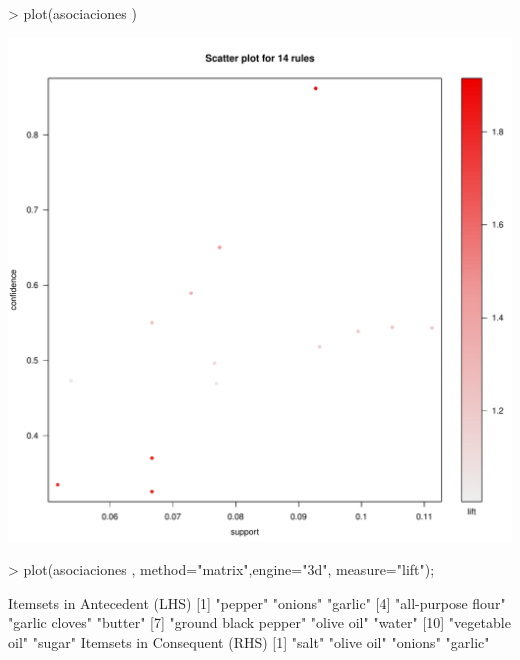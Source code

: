 \documentclass [a4paper] {article}
\begin{document}
\begin{Schunk}
\begin{Sinput}
> plot(asociaciones )
\end{Sinput}
\end{Schunk}
\includegraphics{Practica2-scatter1}
\begin{Schunk}
\begin{Sinput}
> plot(asociaciones , method="matrix",engine="3d", measure="lift");
\end{Sinput}
\begin{Soutput}
Itemsets in Antecedent (LHS)
 [1] "{pepper}"              "{onions}"              "{garlic}"             
 [4] "{all-purpose flour}"   "{garlic cloves}"       "{butter}"             
 [7] "{ground black pepper}" "{olive oil}"           "{water}"              
[10] "{vegetable oil}"       "{sugar}"              
Itemsets in Consequent (RHS)
[1] "{salt}"      "{olive oil}" "{onions}"    "{garlic}"   
\end{Soutput}
\end{Schunk}
\end{document}
